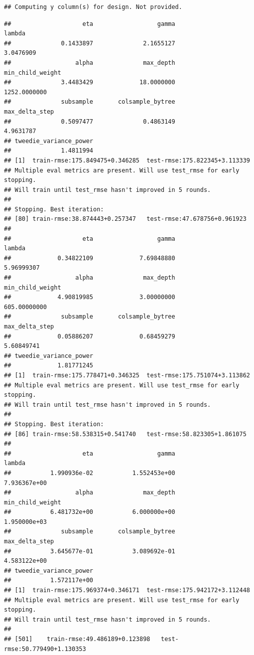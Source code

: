 \documentclass[
]{article}
\begin{document}
\begin{verbatim}
## Computing y column(s) for design. Not provided.
\end{verbatim}

\begin{verbatim}
##                    eta                  gamma                 lambda 
##              0.1433897              2.1655127              3.0476909 
##                  alpha              max_depth       min_child_weight 
##              3.4483429             18.0000000           1252.0000000 
##              subsample       colsample_bytree         max_delta_step 
##              0.5097477              0.4863149              4.9631787 
## tweedie_variance_power 
##              1.4811994 
## [1]  train-rmse:175.849475+0.346285  test-rmse:175.822345+3.113339 
## Multiple eval metrics are present. Will use test_rmse for early stopping.
## Will train until test_rmse hasn't improved in 5 rounds.
## 
## Stopping. Best iteration:
## [80] train-rmse:38.874443+0.257347   test-rmse:47.678756+0.961923
## 
##                    eta                  gamma                 lambda 
##             0.34822109             7.69848880             5.96999307 
##                  alpha              max_depth       min_child_weight 
##             4.90819985             3.00000000           605.00000000 
##              subsample       colsample_bytree         max_delta_step 
##             0.05886207             0.68459279             5.60849741 
## tweedie_variance_power 
##             1.81771245 
## [1]  train-rmse:175.778471+0.346325  test-rmse:175.751074+3.113862 
## Multiple eval metrics are present. Will use test_rmse for early stopping.
## Will train until test_rmse hasn't improved in 5 rounds.
## 
## Stopping. Best iteration:
## [86] train-rmse:58.538315+0.541740   test-rmse:58.823305+1.861075
## 
##                    eta                  gamma                 lambda 
##           1.990936e-02           1.552453e+00           7.936367e+00 
##                  alpha              max_depth       min_child_weight 
##           6.481732e+00           6.000000e+00           1.950000e+03 
##              subsample       colsample_bytree         max_delta_step 
##           3.645677e-01           3.089692e-01           4.583122e+00 
## tweedie_variance_power 
##           1.572117e+00 
## [1]  train-rmse:175.969374+0.346171  test-rmse:175.942172+3.112448 
## Multiple eval metrics are present. Will use test_rmse for early stopping.
## Will train until test_rmse hasn't improved in 5 rounds.
## 
## [501]    train-rmse:49.486189+0.123898   test-rmse:50.779490+1.130353 

\end{verbatim}
\end{document}
